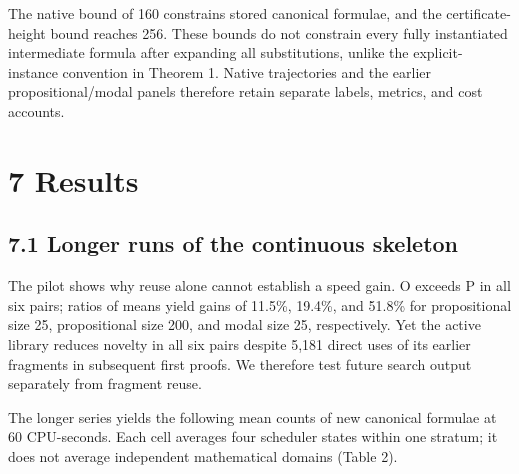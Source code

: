 \documentclass[pdflatex,sn-basic,Numbered]{sn-jnl}
\begin{document}
The native bound of 160 constrains stored canonical formulae, and the certificate-height bound reaches 256. These bounds do not constrain every fully instantiated intermediate formula after expanding all substitutions, unlike the explicit-instance convention in Theorem 1. Native trajectories and the earlier propositional/modal panels therefore retain separate labels, metrics, and cost accounts.

\section*{7 Results}\label{results}

\subsection*{7.1 Longer runs of the continuous skeleton}\label{longer-runs-of-the-continuous-skeleton}

The pilot shows why reuse alone cannot establish a speed gain. O exceeds P in all six pairs; ratios of means yield gains of 11.5\%, 19.4\%, and 51.8\% for propositional size 25, propositional size 200, and modal size 25, respectively. Yet the active library reduces novelty in all six pairs despite 5,181 direct uses of its earlier fragments in subsequent first proofs. We therefore test future search output separately from fragment reuse.

The longer series yields the following mean counts of new canonical formulae at 60 CPU-seconds. Each cell averages four scheduler states within one stratum; it does not average independent mathematical domains (Table 2).

\begingroup
\small
\setlength{\tabcolsep}{3pt}
\renewcommand{\arraystretch}{1.13}
\end{document}
